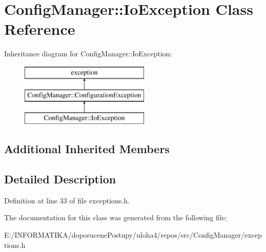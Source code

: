 \hypertarget{class_config_manager_1_1_io_exception}{}\section{Config\+Manager\+:\+:Io\+Exception Class Reference}
\label{class_config_manager_1_1_io_exception}
Inheritance diagram for Config\+Manager\+:\+:Io\+Exception\+:\begin{figure}[H]
\begin{center}
\leavevmode
\includegraphics[height=3.000000cm]{class_config_manager_1_1_io_exception}
\end{center}
\end{figure}
\subsection*{Additional Inherited Members}


\subsection{Detailed Description}


Definition at line 33 of file exceptions.\+h.



The documentation for this class was generated from the following file\+:\begin{DoxyCompactItemize}
\item 
E\+:/\+I\+N\+F\+O\+R\+M\+A\+T\+I\+K\+A/doporucene\+Postupy/uloha4/repos/src/\+Config\+Manager/exceptions.\+h\end{DoxyCompactItemize}
